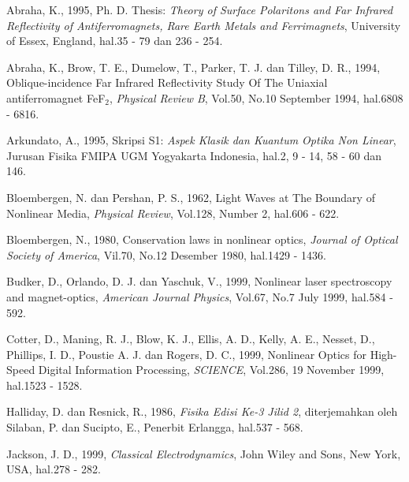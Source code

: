 \documentclass{jtetiproposalskripsi}
\begin{document}
\begin{thebibliography}{99}


	Abraha, K., 1995, Ph. D. Thesis: \emph{Theory of Surface
	Polaritons and Far Infrared Reflectivity of Antiferromagnets, Rare Earth
	Metals and Ferrimagnets}, University of Essex, England, hal.35 - 79 dan 236 -
	254.  

	Abraha, K., Brow, T. E., Dumelow, T., Parker, T. J. dan Tilley, D. R.,  1994,
	Oblique-incidence Far Infrared Reflectivity Study Of The Uniaxial
	antiferromagnet FeF$_2$, \emph{Physical Review B}, Vol.50, No.10 September
	1994, hal.6808 - 6816. 

	Arkundato, A.,  1995, Skripsi S1: \emph{Aspek Klasik dan Kuantum Optika Non
	Linear}, Jurusan Fisika FMIPA UGM Yogyakarta Indonesia, hal.2, 9 - 14, 58 - 60
	dan 146.

	Bloembergen, N. dan Pershan, P. S., 1962, Light Waves at The
	Boundary of Nonlinear Media, \emph{Physical Review}, Vol.128, Number 2,
	hal.606 - 622. 

	Bloembergen, N., 1980, Conservation laws in nonlinear
	optics, \emph{Journal of Optical Society of America}, Vil.70, No.12 Desember
	1980, hal.1429 - 1436.

	Budker, D., Orlando, D. J. dan Yaschuk, V., 1999,
	Nonlinear laser spectroscopy and magnet-optics, \emph{American
	Journal Physics}, Vol.67, No.7 July 1999, hal.584 - 592.

	Cotter, D., Maning, R. J., Blow, K. J., Ellis, A. D., Kelly, A. E.,
	Nesset, D., Phillips, I. D., Poustie A. J. dan Rogers, D. C., 1999,
	Nonlinear Optics for High-Speed Digital Information Processing,
	\emph{SCIENCE}, Vol.286, 19 November 1999, hal.1523 - 1528.

	Halliday, D. dan Resnick, R., 1986, \emph{Fisika Edisi Ke-3
	Jilid 2}, diterjemahkan oleh Silaban, P. dan Sucipto, E., Penerbit Erlangga,
	hal.537 - 568. 

	Jackson, J. D., 1999, \emph{Classical Electrodynamics}, John
	Wiley and Sons, New York, USA, hal.278 - 282.


\end{thebibliography}
\end{document}
